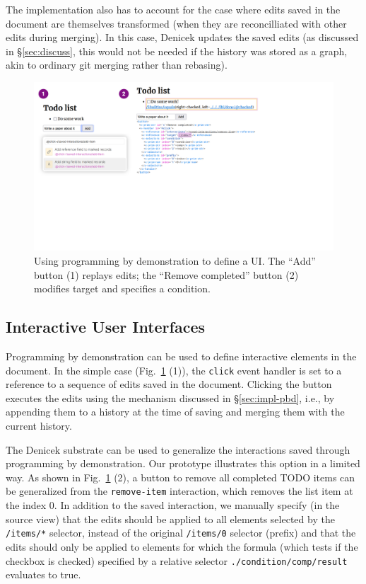 \documentclass[sigconf,anonymous,screen]{acmart}
\begin{document}
The implementation also has to account for the case where edits saved in the document are themselves
transformed (when they are reconcilliated with other edits during merging). In this case, Denicek
updates the saved edits (as discussed in \S\ref{sec:discuss}, this would not be needed if the
history was stored as a graph, akin to ordinary git merging rather than rebasing).

\begin{figure}[t]
\vspace{-0.5em}
\includegraphics[width=1\columnwidth,clip,trim=0.5cm 8.5cm 8.5cm 0.5cm]{fig/interactive.pdf}
\vspace{-1.25em}
\caption{Using programming by demonstration to define a UI. The ``Add'' button (1) replays edits;
the ``Remove completed'' button (2) modifies target and specifies a condition. }
\label{fig:interactive}
\vspace{-2em}
\end{figure}

\subsection{Interactive User Interfaces}
\label{sec:impl-interaction}

Programming by demonstration can be used to define interactive elements in the document. In the
simple case (Fig.~\ref{fig:interactive} (1)), the {\small\Verb_click_} event handler is set to a
reference to a sequence of edits saved in the document. Clicking the button executes the edits
using the mechanism discussed in \S\ref{sec:impl-pbd}, i.e., by appending them to a history at the
time of saving and merging them with the current history.

The Denicek substrate can be used to generalize the interactions saved through programming by
demonstration. Our prototype illustrates this option in a limited way. As shown in
Fig.~\ref{fig:interactive} (2), a button to remove all completed TODO items can be generalized
from the {\small\Verb_remove-item_} interaction, which removes the list item at the index 0.
In addition to the saved interaction, we manually specify (in the source view) that the edits
should be applied to all elements selected by the {\small\Verb_/items/*_} selector, instead of
the original {\small\Verb_/items/0_} selector (prefix) and that the edits should only be
applied to elements for which the formula (which tests if the checkbox is checked) specified by a
relative selector {\small\Verb_./condition/comp/result_} evaluates to true.
\end{document}

